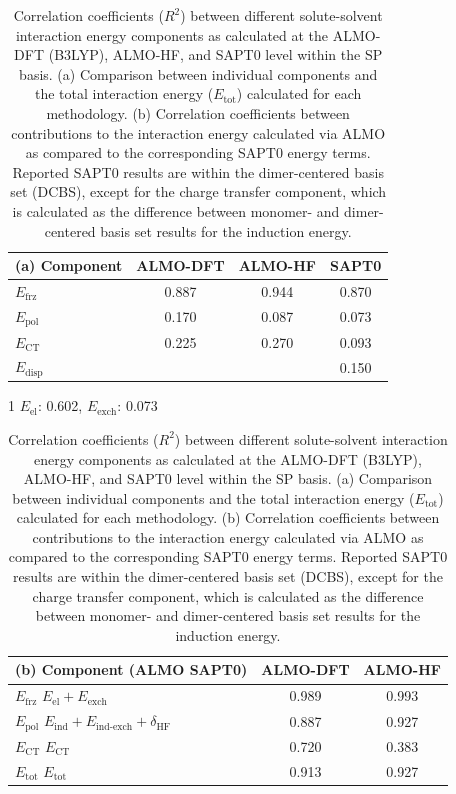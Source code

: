 \documentclass[%
  class = book,%
  crop = false,%
  float = true,%
  multi = true,%
  preview = false,%
]{standalone}
\begin{document}
\begin{table}
  \centering%
  \caption[Correlation between ALMO and SAPT0 terms]{Correlation coefficients (\(R^2\)) between different solute-solvent interaction energy components as calculated at the ALMO-DFT (B3LYP), ALMO-HF, and SAPT0 level within the SP basis. (a) Comparison between individual components and the total interaction energy (\(E_{\text{tot}}\)) calculated for each methodology. (b) Correlation coefficients between contributions to the \cotil interaction energy calculated via ALMO as compared to the corresponding SAPT0 energy terms. Reported SAPT0 results are within the dimer-centered basis set (DCBS), except for the charge transfer component, which is calculated as the difference between monomer- and dimer-centered basis set results for the induction energy.}
  \label{paper_02:tab:7}
  \begin{threeparttable}
    \begin{tabular}{lccc}
      \toprule
      (a) Component & ALMO-DFT & ALMO-HF & SAPT0 \\
      \midrule
      \(E_{\text{frz}}\) & 0.887 & 0.944 & 0.870\tnote{1} \\
      \(E_{\text{pol}}\) & 0.170 & 0.087 & 0.073 \\
      \(E_{\text{CT}}\) & 0.225 & 0.270 & 0.093 \\
      \(E_{\text{disp}}\) & \textemdash{} & \textemdash{} & 0.150 \\
      \bottomrule
    \end{tabular}
    \begin{tablenotes}
    \item[1] \(E_{\text{el}}\): 0.602, \(E_{\text{exch}}\): 0.073
    \end{tablenotes}
  \end{threeparttable}
  \begin{tabular}{lcc}
    \toprule
    (b) Component (ALMO \textemdash{} SAPT0) & ALMO-DFT & ALMO-HF \\
    \midrule
    \(E_{\text{frz}}\) \textemdash{} \(E_{\text{el}} + E_{\text{exch}}\) & 0.989 & 0.993 \\
    \(E_{\text{pol}}\) \textemdash{} \(E_{\text{ind}} + E_{\text{ind-exch}} + \delta_{\text{HF}}\) & 0.887 & 0.927 \\
    \(E_{\text{CT}}\) \textemdash{} \(E_{\text{CT}}\) & 0.720 & 0.383 \\
    \(E_{\text{tot}}\) \textemdash{} \(E_{\text{tot}}\) & 0.913 & 0.927 \\
    \bottomrule
  \end{tabular}
\end{table}
\end{document}
